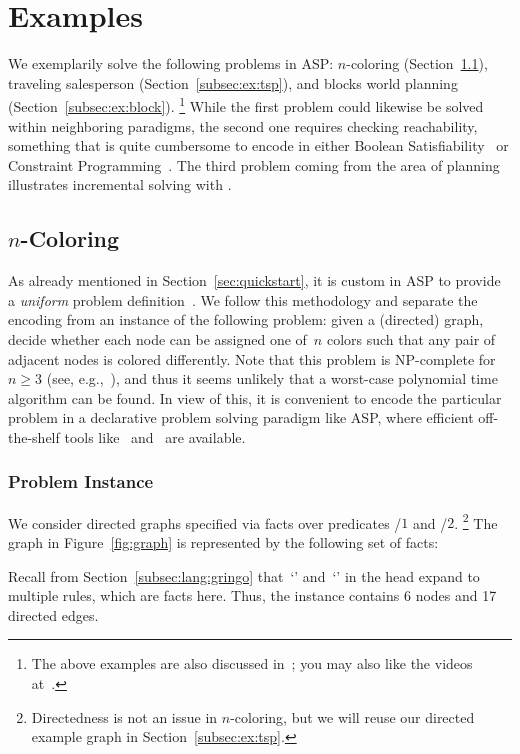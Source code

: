 \section{Examples}\label{sec:examples}

We exemplarily solve the following problems in ASP:
$n$-coloring (Section~\ref{subsec:ex:color}),
traveling salesperson (Section~\ref{subsec:ex:tsp}), and
blocks world planning (Section~\ref{subsec:ex:block}).%
\footnote{The above examples are also discussed in~\cite{gekakasc12a};
  you may also like the videos at~\cite{potassco}.}
While the first problem could likewise be solved within neighboring paradigms,
the second one requires checking reachability,
something that is quite cumbersome to encode in either
Boolean Satisfiability~\cite{SATHandbook} or
Constraint Programming~\cite{CPHandbook}.
The third problem coming from the area of planning
illustrates incremental solving with \clingo.

\subsection{\texorpdfstring{$n$}{n}-Coloring}\label{subsec:ex:color}

As already mentioned in Section~\ref{sec:quickstart},
it is custom in ASP to provide a \emph{uniform}
problem definition~\cite{martru99a,niemela99a,schlipf95a}.
We follow this methodology and separate the encoding
from an instance of the following problem:
given a (directed) graph, decide whether each node can be assigned
one of~$n$ colors such that any pair of adjacent nodes is colored differently.
Note that this problem is NP-complete for~$n\geq 3$
(see, e.g.,~\cite{papadimitriou94a}),
and thus it seems unlikely that a worst-case polynomial time algorithm
can be found.
In view of this,
it is convenient to encode %
the particular problem in %
a declarative problem solving paradigm like ASP,
where efficient off-the-shelf tools like \gringo\ and \clasp\
are available. %

\subsubsection{Problem Instance}\label{subsec:color:instance}

We consider directed graphs specified via facts over predicates
/$1$ and /$2$.%
\footnote{%
  Directedness is not an issue in $n$-coloring,
  but we will reuse our directed example graph in Section~\ref{subsec:ex:tsp}.}
The graph %
in Figure~\ref{fig:graph} is represented by the following set of facts:
%

%
Recall from Section~\ref{subsec:lang:gringo} that~`' and~`\code{;}'
in the head expand to multiple rules, which are facts here.
Thus, the instance contains 6 nodes and 17 directed edges.
%


